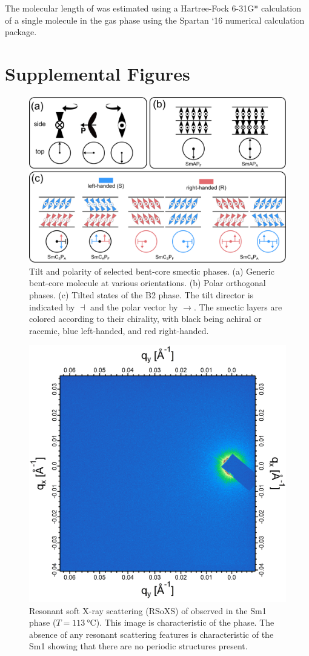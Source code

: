 \documentclass[superscriptaddress,floatfix,onecolumn,notitlepage]{revtex4-1}
\begin{document}
The molecular length of  was estimated using a Hartree-Fock 6-31G*
calculation of a single molecule in the gas phase using the Spartan ‘16
numerical calculation package.

\clearpage

\section{Supplemental Figures}

\begin{figure}[H]
    \centering
    \includegraphics[width=.7\textwidth]{bent-core-phase-diagrams-suppFinal.png}
    \caption{Tilt and polarity of selected bent-core smectic phases. (a) Generic
    bent-core molecule at various orientations. (b) Polar orthogonal  phases.
    (c) Tilted states of the B2 phase.
    The tilt director is indicated by $\dashv$  and the polar vector by $\rightarrow$.
    The smectic layers are colored according to their chirality, with black being achiral or
    racemic, blue left-handed, and red
     right-handed. }
\end{figure}

\begin{figure}[H]
    \centering
    \includegraphics[width=.5\textwidth]{rsosxSmaT113-modified.png}
    \caption{Resonant soft X-ray scattering (RSoXS) of  observed in
        the Sm1 phase ($T=\SI{113}{\degreeCelsius}$). This image is
        characteristic of the phase. The absence of any
        resonant scattering features is characteristic of the Sm1 showing that
        there are no periodic
    structures present.}
\end{figure}
\end{document}
